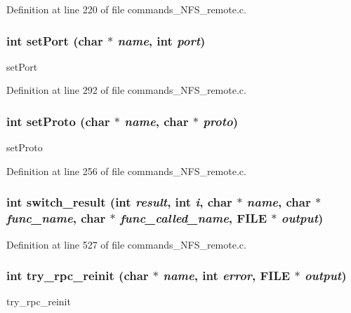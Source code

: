 Definition at line 220 of file commands\_\-NFS\_\-remote.c.
\subsubsection[{setPort}]{\setlength{\rightskip}{0pt plus 5cm}int setPort (char $\ast$ {\em name}, \/  int {\em port})}\label{commands__NFS__remote_8c_a817b2d1e48b69e9c8ee3cdbb2597b170}
setPort 

Definition at line 292 of file commands\_\-NFS\_\-remote.c.
\subsubsection[{setProto}]{\setlength{\rightskip}{0pt plus 5cm}int setProto (char $\ast$ {\em name}, \/  char $\ast$ {\em proto})}\label{commands__NFS__remote_8c_a54178d13d361fe5b0d566cca44760f21}
setProto 

Definition at line 256 of file commands\_\-NFS\_\-remote.c.
\subsubsection[{switch\_\-result}]{\setlength{\rightskip}{0pt plus 5cm}int switch\_\-result (int {\em result}, \/  int {\em i}, \/  char $\ast$ {\em name}, \/  char $\ast$ {\em func\_\-name}, \/  char $\ast$ {\em func\_\-called\_\-name}, \/  FILE $\ast$ {\em output})}\label{commands__NFS__remote_8c_a30ef541dd689d04487fd238c0a5d9dce}


Definition at line 527 of file commands\_\-NFS\_\-remote.c.
\subsubsection[{try\_\-rpc\_\-reinit}]{\setlength{\rightskip}{0pt plus 5cm}int try\_\-rpc\_\-reinit (char $\ast$ {\em name}, \/  int {\em error}, \/  FILE $\ast$ {\em output})}\label{commands__NFS__remote_8c_a24a3727e813049c3490dd48684694b43}
try\_\-rpc\_\-reinit 

